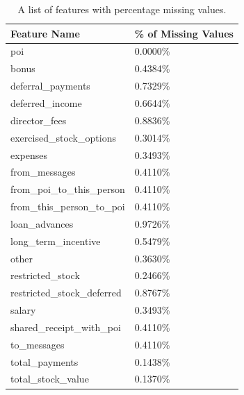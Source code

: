 \documentclass[twoside,openright,titlepage,numbers=noenddot,headinclude,%
               footinclude=true,cleardoublepage=empty,abstractoff,BCOR=5mm,%
               paper=a4,fontsize=11pt,ngerman,american]{scrreprt}
\numberwithin{theorem}{chapter}
\numberwithin{definition}{chapter}
\numberwithin{algorithm}{chapter}
\numberwithin{figure}{chapter}
\numberwithin{table}{chapter}
\numberwithin{equation}{chapter}
\begin{document}
\begin{table}[!htbp]
  \begin{center}
  \caption{A list of features with percentage missing values.}
    \begin{tabular}{ |p{5cm}|p{3cm}| } 
    \hline
    Feature Name &  \% of \textbf{Missing} Values\\[1ex]

    \hline
    poi                            & 0.0000\% \\
    bonus                          & 0.4384\% \\
    deferral\_payments              & 0.7329\% \\
    deferred\_income                & 0.6644\% \\
    director\_fees                  & 0.8836\% \\
    exercised\_stock\_options        & 0.3014\% \\
    expenses                       & 0.3493\% \\
    from\_messages                  & 0.4110\% \\
    from\_poi\_to\_this\_person        & 0.4110\% \\
    from\_this\_person\_to\_poi        & 0.4110\% \\
    loan\_advances                  & 0.9726\% \\
    long\_term\_incentive            & 0.5479\% \\
    other                          & 0.3630\% \\
    restricted\_stock               & 0.2466\% \\
    restricted\_stock\_deferred      & 0.8767\% \\
    salary                         & 0.3493\% \\
    shared\_receipt\_with\_poi        & 0.4110\% \\
    to\_messages                    & 0.4110\% \\
    total\_payments                 & 0.1438\% \\
    total\_stock\_value              & 0.1370\% \\
    \hline
    \end{tabular}
    \label{tableFeatureMissing}
  \end{center}
\end{table}
\end{document}
